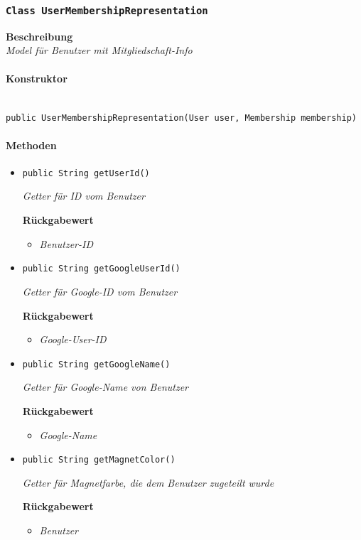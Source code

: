      \subsubsection{\texttt{Class UserMembershipRepresentation}}
     \textbf{Beschreibung} \\
     \textit{Model für Benutzer mit Mitgliedschaft-Info}
     \paragraph*{Konstruktor}\mbox{} \\
     \texttt{public UserMembershipRepresentation(User user, Membership membership)}
     \paragraph*{Methoden}
     \begin{itemize}
     	\item{\texttt{public String getUserId()}}
     	
     	\textit{Getter für ID vom Benutzer}
     	
     	\textbf{Rückgabewert}
     	\begin{itemize}
     		\item\textit{Benutzer-ID}
     	\end{itemize}
     
     \item{\texttt{public String getGoogleUserId()}}
     	
     	\textit{Getter für Google-ID vom Benutzer}
     	
     	\textbf{Rückgabewert}
     	\begin{itemize}
     		\item\textit{Google-User-ID}
     	\end{itemize}
     
     \item{\texttt{public String getGoogleName()}}
     	
     	\textit{Getter für Google-Name von Benutzer}
     	
     	\textbf{Rückgabewert}
     	\begin{itemize}
     		\item\textit{Google-Name}
     	\end{itemize}
     
     \item{\texttt{public String getMagnetColor()}}
     	
     	\textit{Getter für Magnetfarbe, die dem Benutzer zugeteilt wurde}
     	
     	\textbf{Rückgabewert}
     	\begin{itemize}
     		\item\textit{Benutzer}
     	\end{itemize}
     \end{itemize}
 
